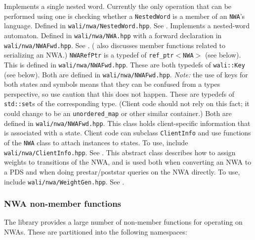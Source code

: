 \begin{functionlist}
   Implements a single nested word. Currently the only
    operation that can be performed using one is checking whether a
    \texttt{NestedWord} is a member of an \texttt{NWA}'s language. Defined in
    \texttt{wali/nwa/NestedWord.hpp}. See .
   Implements a nested-word automaton. Defined in
    \texttt{wali/nwa/NWA.hpp} with a forward declaration in \texttt{wali/nwa/NWAFwd.hpp}.
    See
    . ( also discusses member
    functions related to serializing an NWA.)
   \texttt{NWARefPtr} is a typedef of \texttt{ref\_ptr$<$NWA$>$} (see
    below). This is defined in \texttt{wali/nwa/NWAFwd.hpp}.
   These are both typedefs of
    \texttt{wali::Key} (see below). Both are defined in
    \texttt{wali/nwa/NWAFwd.hpp}. \emph{Note:} the use of keys for both
    states and symbols means that they can be confused from a types
    perspective, so use caution that this does not happen. 
   These are typedefs of
    \texttt{std::set}s of the corresponding type. (Client code should not
    rely on this
    fact; it could change to be an \texttt{unordered\_map} or other similar
    container.) Both are defined in \texttt{wali/nwa/NWAFwd.hpp}.
   This class holds client-specific information that
    is associated with a state. Client code can subclass \texttt{ClientInfo} and use
    functions of the \texttt{NWA} class to attach instances to states. To use,
    include \texttt{wali/nwa/ClientInfo.hpp}. See .
   This abstract class describes how to assign weights
    to transitions of the NWA, and is used both when converting an NWA to a
    PDS and when doing prestar/poststar queries on the NWA directly. To use,
    include \texttt{wali/nwa/WeightGen.hpp}. See .
\end{functionlist}


\subsubsection{NWA non-member functions}

The library provides a large number of non-member functions for operating on
NWAs. These are partitioned into the following namespaces:

